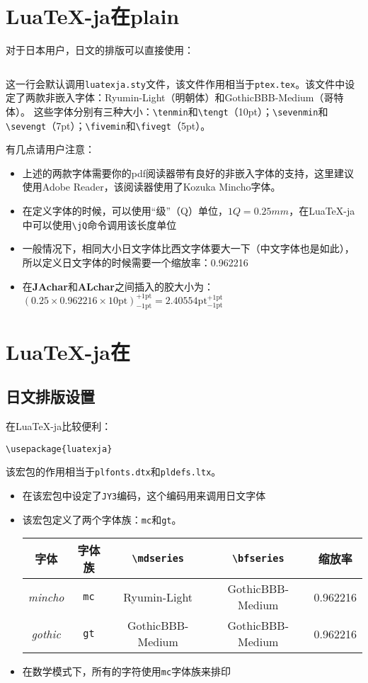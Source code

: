 \documentclass{ltjarticle}
\def\LuaTeX{Lua\TeX}
\def\pTeX{p\TeX}
\def\pLaTeX{p\LaTeX}
\begin{document}
\section{\LuaTeX-ja在plain }
对于日本用户，日文的排版可以直接使用：
\begin{verbatim}

\end{verbatim}

这一行会默认调用\verb!luatexja.sty!文件，该文件作用相当于\verb!ptex.tex!。该文件中设定了两款非嵌入字体：Ryumin-Light（明朝体）和GothicBBB-Medium（哥特体）。
这些字体分别有三种大小：\verb!\tenmin!和\verb!\tengt!（10pt）；\verb!\sevenmin!和\verb!\sevengt!（7pt）；\verb!\fivemin!和\verb!\fivegt!（5pt）。

有几点请用户注意：
\begin{itemize}
\item 上述的两款字体需要你的pdf阅读器带有良好的非嵌入字体的支持，这里建议使用Adobe Reader，该阅读器使用了Kozuka Mincho字体。
\item 在定义字体的时候，可以使用“级”（Q）单位，$1 Q = 0.25mm$，在\LuaTeX-ja中可以使用\verb!\jQ!命令调用该长度单位
\item 一般情况下，相同大小日文字体比西文字体要大一下（中文字体也是如此），所以定义日文字体的时候需要一个缩放率：0.962216
\item 在\textbf{JAchar}和\textbf{ALchar}之间插入的胶大小为：$(0.25\times0.962216\times\mathrm{10pt})^{\mathrm{+1pt}}_{\mathrm{-1pt}} = 2.40554\mathrm{pt}^{\mathrm{+1pt}}_{\mathrm{-1pt}}$
\end{itemize}
\section{\LuaTeX-ja在}
\subsection{日文排版设置}
在\LuaTeX-ja比较便利：
\begin{verbatim}
\usepackage{luatexja}
\end{verbatim}

该宏包的作用相当于\verb!plfonts.dtx!和\verb!pldefs.ltx!。
\begin{itemize}
\item 在该宏包中设定了\verb!JY3!编码，这个编码用来调用日文字体
\item 该宏包定义了两个字体族：\verb!mc!和\verb!gt!。\\
\begin{center}
	\begin{tabular}{ccccc}
	\hline
	字体&字体族&\verb!\mdseries!&\verb!\bfseries!&缩放率\\
	\hline
	\textit{mincho}&\verb!mc!&Ryumin-Light&GothicBBB-Medium&0.962216\\
	\textit{gothic}&\verb!gt!&GothicBBB-Medium&GothicBBB-Medium&0.962216\\
	\hline
	\end{tabular}
\end{center}
\item 在数学模式下，所有的字符使用\verb!mc!字体族来排印
\end{itemize}
\end{document}
